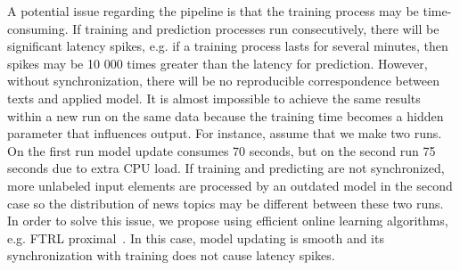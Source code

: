 A potential issue regarding the pipeline is that the training process may be time-consuming. If training and prediction processes run consecutively, there will be significant latency spikes, e.g. if a training process lasts for several minutes, then spikes may be 10 000 times greater than the latency for prediction. However, without synchronization, there will be no reproducible correspondence between texts and applied model. It is almost impossible to achieve the same results within a new run on the same data because the training time becomes a hidden parameter that influences output. For instance, assume that we make two runs. On the first run model update consumes 70 seconds, but on the second run 75 seconds due to extra CPU load. If training and predicting are not synchronized, more unlabeled input elements are processed by an outdated model in the second case so the distribution of news topics may be different between these two runs. In order to solve this issue, we propose using efficient online learning algorithms, e.g. FTRL proximal~\cite{mcmahan2013ad}. In this case, model updating is smooth and its synchronization with training does not cause latency spikes.